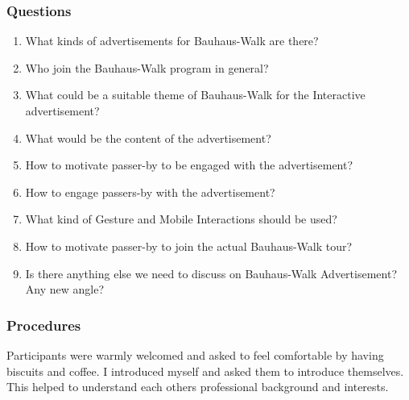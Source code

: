 \subsubsection{Questions}
\begin{enumerate}
\item   What kinds of advertisements for Bauhaus-Walk are there?
\item   Who join the Bauhaus-Walk program in general?
\item   What could be a suitable theme of Bauhaus-Walk for the Interactive advertisement?
\item   What would be the content of the advertisement?
\item   How to motivate passer-by to be engaged with the advertisement?
\item   How to engage passers-by with the advertisement?
\item   What kind of Gesture and Mobile Interactions should be used?
\item   How to motivate passer-by to join the actual Bauhaus-Walk tour?
\item   Is there anything else we need to discuss on Bauhaus-Walk Advertisement? Any new angle?

\end{enumerate}

\subsubsection{Procedures}
Participants were warmly welcomed and asked to feel comfortable by having biscuits and coffee. I introduced myself and asked them to introduce themselves. This helped to understand each others professional background and interests. 

